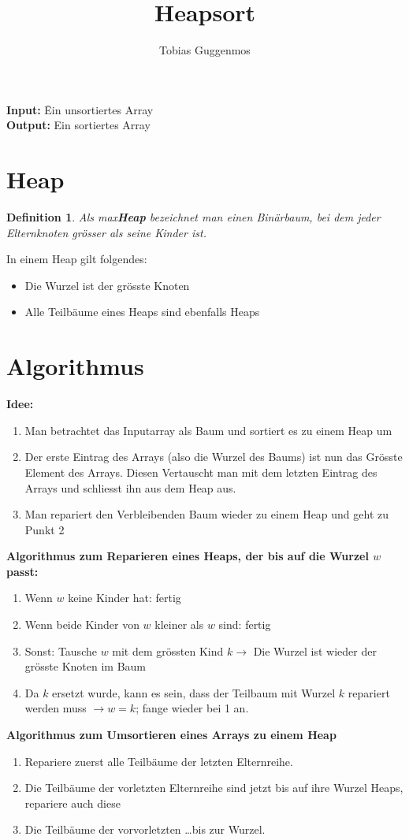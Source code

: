 \documentclass[11pt,a4paper]{article}
\title{Heapsort}
\author{Tobias Guggenmos}
\numberwithin{equation}{section}
\numberwithin{figure}{section}
\newtheorem{Def}{Definition}
\begin{document}
\maketitle
\begin{tabbing}
\=\textbf{Input:} \hspace{1cm}\=Ein unsortiertes Array\\
\>\textbf{Output:} \>Ein sortiertes Array

\end{tabbing}
\section{Heap}
\begin{Def}
	Als max\textbf{Heap} bezeichnet man einen Bin\"arbaum, bei dem jeder Elternknoten gr\"osser als seine Kinder ist.
\end{Def}
In einem Heap gilt folgendes:
\begin{itemize}
\item Die Wurzel ist der gr\"osste Knoten
\item Alle Teilb\"aume eines Heaps sind ebenfalls Heaps
\end{itemize}
\section{Algorithmus}
\textbf{Idee:}
\begin{enumerate}
\item Man betrachtet das Inputarray als Baum und sortiert es zu einem Heap um
\item Der erste Eintrag des Arrays (also die Wurzel des Baums) ist nun das Gr\"osste Element des Arrays. Diesen Vertauscht man mit dem letzten Eintrag des Arrays und schliesst ihn aus dem Heap aus.
\item Man repariert den Verbleibenden Baum wieder zu einem Heap und geht zu Punkt 2
\end{enumerate}
\textbf{Algorithmus zum Reparieren eines Heaps, der bis auf die Wurzel $w$ passt:}

\begin{enumerate}
\item Wenn $w$ keine Kinder hat: fertig
\item Wenn beide Kinder von $w$ kleiner als $w$ sind: fertig
\item Sonst: Tausche $w$ mit dem gr\"ossten Kind $k\rightarrow$ Die Wurzel  ist wieder der gr\"osste Knoten im Baum
\item Da $k$ ersetzt wurde, kann es sein, dass der Teilbaum mit Wurzel $k$ repariert werden muss $\rightarrow w=k$; fange wieder bei 1 an.
\end{enumerate}
\textbf{Algorithmus zum Umsortieren eines Arrays zu einem Heap}
\begin{enumerate}
\item Repariere zuerst alle Teilb\"aume der letzten Elternreihe.
\item Die Teilb\"aume der vorletzten Elternreihe sind jetzt bis auf ihre Wurzel Heaps, repariere auch diese
\item Die Teilb\"aume der vorvorletzten \dots bis zur Wurzel. 
\end{enumerate}
\end{document}
